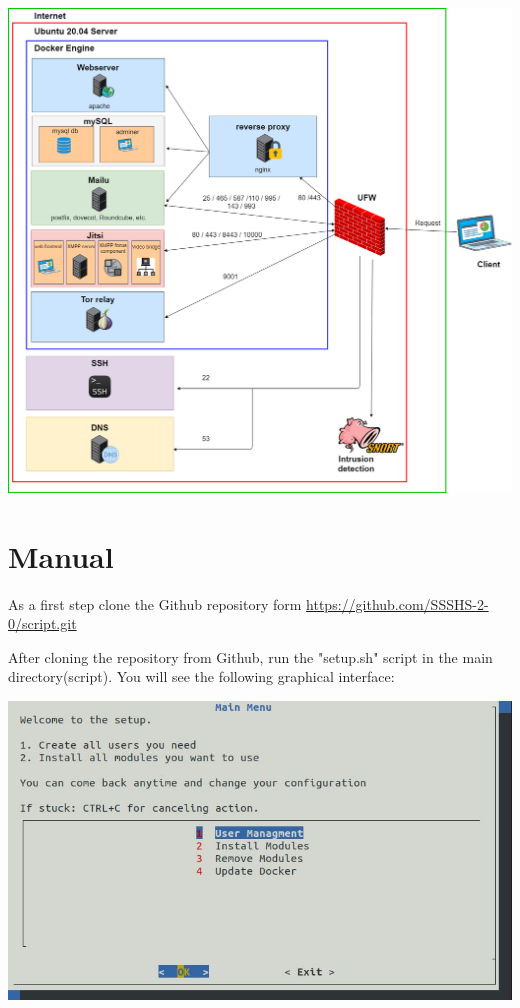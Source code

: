 \documentclass[a4paper,10pt]{scrartcl}
\begin{document}
\includegraphics[width=\textwidth]{overview2}

\pagebreak

\section{Manual}

As a first step clone the Github repository form \url{https://github.com/SSSHS-2-0/script.git}

\noindent After cloning the repository from Github, run the "setup.sh" script in the main directory(script). You will see the following graphical interface: \newline

\includegraphics[width=\textwidth]{mainmenu} \newline
\end{document}
